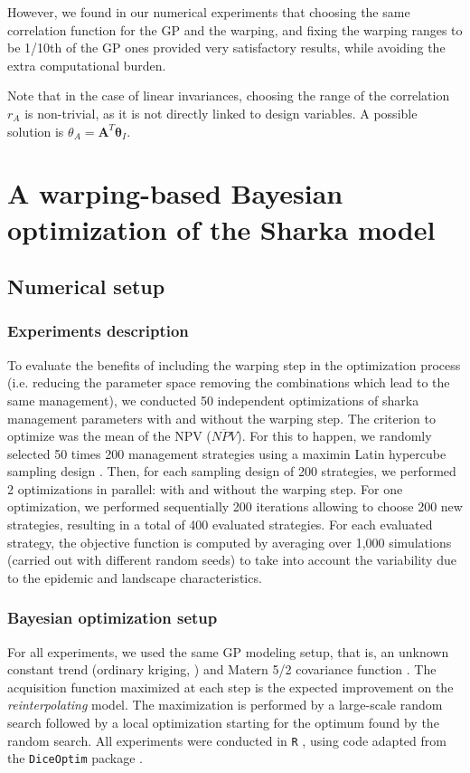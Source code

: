 However, we found in our numerical experiments that choosing the same correlation function for the GP and the warping, and fixing 
the warping ranges to be 1/10th of the GP ones provided very satisfactory results, while avoiding the extra computational burden.

Note that in the case of linear invariances, choosing the range of the correlation $r_A$ is non-trivial, as it is not directly linked to design variables. 
A possible solution is $\theta_A = \mathbf{A}^T \boldsymbol{\theta}_I$.

\section{A warping-based Bayesian optimization of the Sharka model}

\subsection{Numerical setup}

\subsubsection{Experiments description}

To evaluate the benefits of including the warping step in the optimization process (i.e. reducing the parameter space removing the combinations which lead to the same management), 
we conducted 50 independent optimizations of sharka management parameters with and without the warping step. The criterion to optimize was the mean of the NPV ($\overline{NPV}$).
For this to happen, we randomly selected 50 times 200 management strategies using a maximin Latin hypercube sampling design \cite{fang2005design}. 
Then, for each sampling design of 200 strategies, we performed 2 optimizations in parallel: with and without the warping step. 
For one optimization, we performed sequentially 200 iterations allowing to choose 200 new strategies, resulting in a total of 400 evaluated strategies.
For each evaluated strategy, the objective function is computed by averaging over 1,000 simulations (carried out with different random seeds) 
to take into account the variability due to the epidemic and landscape characteristics.

\subsubsection{Bayesian optimization setup}
For all experiments, we used the same GP modeling setup, that is, an unknown constant trend (ordinary kriging, \cite{matheron1963principles}) and 
Matern 5/2 covariance function \cite[][Chapter 4]{Rasmussen2006}. The acquisition function maximized at each step is the expected improvement on the 
\textit{reinterpolating} model. The maximization is performed by a large-scale random search followed by a local optimization starting for the optimum found by the random search.
All experiments were conducted in \texttt{R} \cite{R2018}, using code adapted from the \texttt{DiceOptim} package \cite{picheny2014noisy}.

